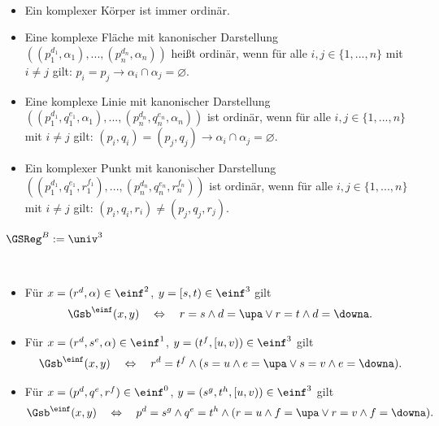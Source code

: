 \begin{dfn}[Ordinärität]\ 
    \begin{itemize}
        \item Ein komplexer Körper ist immer ordinär.
        \item Eine komplexe Fläche mit kanonischer Darstellung $((p_1^{d_1}, \alpha_1), ..., (p_n^{d_n}, \alpha_n))$ heißt ordinär, wenn für alle $i,j \in \{1, ..., n\}$ mit $i \neq j$ gilt: $p_i = p_j \to \alpha_i \cap \alpha_j = \varnothing$.
        \item Eine komplexe Linie mit kanonischer Darstellung $((p_1^{d_1}, q_1^{e_1}, \alpha_1), ... , (p_n^{d_n}, q_n^{e_n}, \alpha_n))$ ist ordinär, wenn für alle $i,j \in \{1, ..., n\}$ mit $i \neq j$ gilt: $(p_i,q_i) = (p_j,q_j) \to \alpha_i \cap \alpha_j = \varnothing$.
        \item Ein komplexer Punkt mit kanonischer Darstellung $((p_1^{d_1}, q_1^{e_1}, r_1^{f_1}), ... , (p_n^{d_n}, q_n^{e_n}, r_n^{f_n}))$ ist ordinär, wenn für alle $i,j \in \{1, ..., n\}$ mit $i \neq j$ gilt: $(p_i, q_i,r_i) \neq (p_j,q_j,r_j)$.
    \end{itemize}
\end{dfn}


\begin{dfn}[$\GSReg$]
    $\GSReg^B := \univ^3$
\end{dfn}


\begin{dfn}[$\Gsb^\einf$]\ 
    \begin{itemize}
        \item Für $x = (r^d,\alpha) \in \einf^2$, $y = [s,t) \in \einf^3$ gilt
            \begin{align*}
                \Gsb^\einf(x,y) 
                \quad \Leftrightarrow \quad 
                r=s \land d=\upa \lor r=t \land d=\downa.
            \end{align*}
        \item Für $x = (r^d,s^e,\alpha) \in \einf^1$, $y = (t^f, [u,v)) \in \einf^3$ gilt
            \begin{align*}
                \Gsb^\einf(x,y) 
                \quad \Leftrightarrow \quad 
                r^d = t^f \land ( s=u \land e=\upa \lor s=v \land e=\downa ).
            \end{align*}
        \item Für $x = (p^d,q^e,r^f) \in \einf^0$, $y = (s^g, t^h, [u,v)) \in \einf^3$ gilt
            \begin{align*}
                \Gsb^\einf(x,y) 
                \quad \Leftrightarrow \quad 
                p^d = s^g \land q^e = t^h \land ( r=u \land f=\upa \lor r=v \land f=\downa ).
            \end{align*}
    \end{itemize}
\end{dfn}


